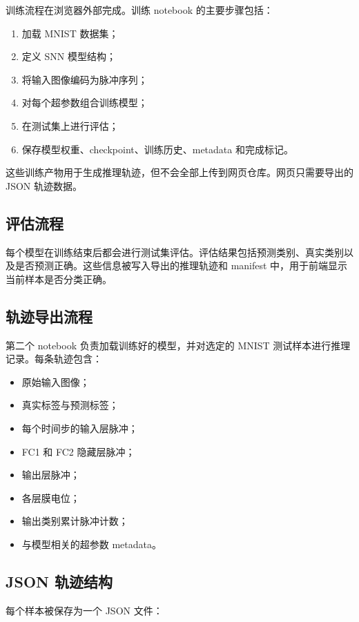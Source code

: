 \documentclass[UTF8,11pt,a4paper]{ctexart}
\begin{document}
训练流程在浏览器外部完成。训练 notebook 的主要步骤包括：

\begin{enumerate}
    \item 加载 MNIST 数据集；
    \item 定义 SNN 模型结构；
    \item 将输入图像编码为脉冲序列；
    \item 对每个超参数组合训练模型；
    \item 在测试集上进行评估；
    \item 保存模型权重、checkpoint、训练历史、metadata 和完成标记。
\end{enumerate}

这些训练产物用于生成推理轨迹，但不会全部上传到网页仓库。网页只需要导出的 JSON 轨迹数据。

\subsection{评估流程}

每个模型在训练结束后都会进行测试集评估。评估结果包括预测类别、真实类别以及是否预测正确。这些信息被写入导出的推理轨迹和 manifest 中，用于前端显示当前样本是否分类正确。

\subsection{轨迹导出流程}

第二个 notebook 负责加载训练好的模型，并对选定的 MNIST 测试样本进行推理记录。每条轨迹包含：

\begin{itemize}
    \item 原始输入图像；
    \item 真实标签与预测标签；
    \item 每个时间步的输入层脉冲；
    \item FC1 和 FC2 隐藏层脉冲；
    \item 输出层脉冲；
    \item 各层膜电位；
    \item 输出类别累计脉冲计数；
    \item 与模型相关的超参数 metadata。
\end{itemize}

\subsection{JSON 轨迹结构}

每个样本被保存为一个 JSON 文件：
\end{document}
